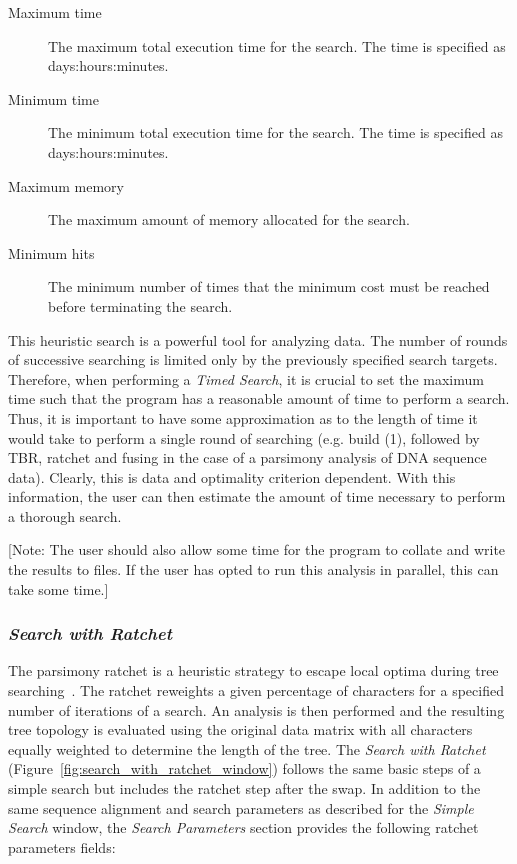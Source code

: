 {\begin{description}
    \item[Maximum time] The maximum total execution time for the search. The time is specified as
        days:hours:minutes.
    \item[Minimum time] The minimum total execution time for the search. The time is specified as
        days:hours:minutes.
    \item[Maximum memory] The maximum amount of memory allocated for the search.
    \item[Minimum hits] The minimum number of times that the minimum cost must be reached before terminating the search.
\end{description}

This heuristic search is a powerful tool for analyzing data. The number of rounds of successive searching is limited 
only by the previously specified search targets. Therefore, when performing a \emph{Timed Search}, it is crucial to 
set the maximum time such that the program has a reasonable amount of time to perform a search.  Thus, it is important 
to have some approximation as to the length of time it would take to perform a single round of searching (e.g. build (1), 
followed by TBR, ratchet and fusing in the case of a parsimony analysis of DNA sequence data).  Clearly, this is data 
and optimality criterion dependent.  With this information, the user can then estimate the amount of time necessary to 
perform a thorough search.  

[Note: The user should also allow some time for the program to collate and write the results to 
files.  If the user has opted to run this analysis in parallel, this can take some time.]

\subsubsection*{\emph{Search with Ratchet}}

The parsimony ratchet is a heuristic strategy to escape  local optima during tree searching~\cite{Nixon1999}. The 
ratchet reweights a given percentage of characters for a specified number of iterations of a search. An analysis is 
then performed and the resulting tree topology is evaluated using the original data matrix with all characters equally 
weighted to determine the length of the tree. The \emph{Search with Ratchet} (Figure~\ref{fig:search_with_ratchet_window}) 
follows the same basic steps of a simple search but includes the ratchet step after the swap. In addition to the same sequence 
alignment and search parameters as described for the \emph{Simple Search} window, the \emph{Search Parameters} section 
provides the following ratchet parameters fields:

}
